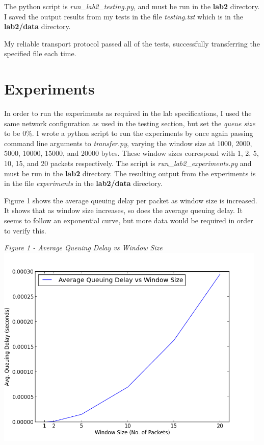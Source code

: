 \documentclass[11pt]{article}
\begin{document}
\vspace{0.25cm}

The python script is \textit{run\_lab2\_testing.py}, and must be run in the \textbf{lab2} directory. I saved the output results from my tests in the file \textit{testing.txt} which is in the \textbf{lab2/data} directory.

My reliable transport protocol passed all of the tests, successfully transferring the specified file each time.
\vspace{0.25cm}

\section{Experiments}

In order to run the experiments as required in the lab specifications, I used the same network configuration as used in the testing section, but set the \textit{queue size} to be 0\%. I wrote a python script to run the experiments by once again passing command line arguments to \textit{transfer.py}, varying the window size at 1000, 2000, 5000, 10000, 15000, and 20000 bytes. These window sizes correspond with 1, 2, 5, 10, 15, and 20 packets respectively. The script is \textit{run\_lab2\_experiments.py} and must be run in the \textbf{lab2} directory. The resulting output from the experiments is in the file \textit{experiments} in the \textbf{lab2/data} directory.
\vspace{0.25cm}

Figure 1 shows the average queuing delay per packet as window size is increased.  It shows that as window size increases, so does the average queuing delay. It seems to follow an exponential curve, but more data would be required in order to verify this.
\vspace{0.25cm}

\textit{Figure 1 - Average Queuing Delay vs Window Size}
\\
\includegraphics[width=13cm]{data/AvgQueuingDelayLinePlot}
\vspace{0.25cm}
\end{document}

